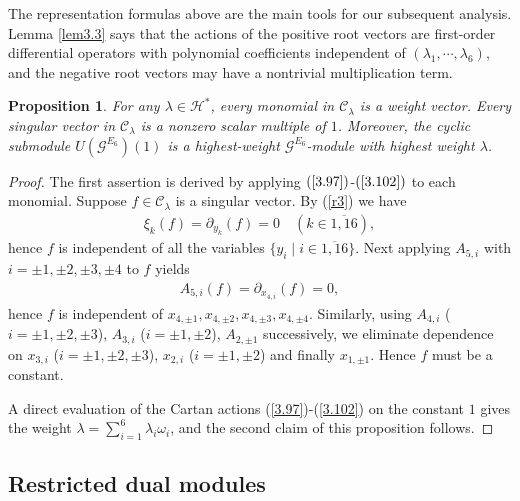 \documentclass[12pt]{article}
\numberwithin{equation}{section}
\newtheorem{proposition}[theorem]{Proposition}
\theoremstyle{definition}
\theoremstyle{remark}
\begin{document}
The representation formulas above are the main tools for our subsequent analysis. Lemma \ref{lem3.3} says that the actions of the positive root vectors are first-order differential operators with polynomial coefficients independent of $(\lambda_1,\cdots,\lambda_6)$, and the negative root vectors may have a nontrivial multiplication term.



\begin{proposition}{\label{prop3.4}}
	For any $\lambda\in \mathscr{H}^*$, every monomial in $\mathscr{C}_{\lambda}$ is a weight vector. Every singular vector in $\mathscr{C}_{\lambda}$ is a nonzero scalar multiple of $1$. Moreover, the cyclic submodule $U(\mathscr{G}^{E_6})(1)$ is a highest-weight $\mathscr{G}^{E_6}$-module with highest weight $\lambda$. 
\end{proposition}
\begin{proof}
	The first assertion is derived by applying $(\ref{3.97})$-$(\ref{3.102})$ to each monomial.
	Suppose $f\in\mathscr{C}_{\lambda}$ is a singular vector. By (\ref{r3}) we have
	\begin{eqnarray}
		\xi_k(f)=\partial_{y_k}(f)=0\quad(k\in\overline{1,16}),
	\end{eqnarray}
	hence $f$ is independent of all the variables $\{y_i\mid i\in\overline{1,16}\}$. Next applying $A_{5,i}$ with $i=\pm1,\pm2,\pm3,\pm4$ to $f$ yields
	\begin{eqnarray}
		A_{5,i}(f)=\partial_{x_{4,i}}(f)=0,\label{3.114}
	\end{eqnarray}
	hence $f$ is independent of $x_{4,\pm1},x_{4,\pm2},x_{4,\pm3},x_{4,\pm4}$. Similarly, using $A_{4,i}$ ($i=\pm1,\pm2,\pm3$), $A_{3,i}$ ($i=\pm1,\pm2$), $A_{2,\pm1}$ successively, we eliminate dependence on $x_{3,i}$ ($i=\pm1,\pm2,\pm3$), $x_{2,i}$ ($i=\pm1,\pm2$) and finally $x_{1,\pm1}$. Hence $f$ must be a constant.
	
	A direct evaluation of the Cartan actions (\ref{3.97})-(\ref{3.102}) on the constant $1$ gives the weight $\lambda=\sum_{i=1}^6\lambda_i\omega_i$,
	and the second claim of this proposition follows.
\end{proof}


\subsection{Restricted dual modules}
\end{document}
